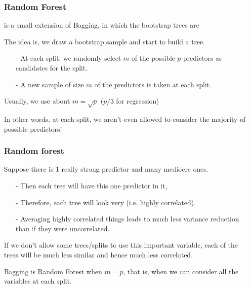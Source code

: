 \documentclass[12pt]{beamer}
\begin{document}
\begin{frame}[fragile]
\frametitle{Random Forest}
 is a small extension of Bagging, in which the bootstrap trees are   

\vsp
The idea is, we draw a bootstrap sample and start to build a tree. 
\begin{itemize}
\item[-] At each split, we randomly select
$m$ of the possible $p$ predictors as candidates for the split. 
\item[-] A new sample of size $m$ of the predictors is taken at each split. 
\end{itemize}   

\vsp
Usually, we use about $m = \sqrt{p}$  ($p/3$ for regression)\Note


\vsp
In other words, at each split, we aren't even allowed to consider the majority of possible predictors!
\end{frame}

\begin{frame}[fragile]
\frametitle{Random forest}

\vsp
Suppose there is 1 really strong predictor and many mediocre ones. 

\begin{itemize}
\item[-] Then each tree will have this one predictor in it,
\item[-] Therefore, each tree will look very  (i.e. highly correlated).  
\item[-] Averaging highly correlated things leads to much less variance reduction than if they were uncorrelated.
\end{itemize}
\vsp
If we don't allow some trees/splits to use this important variable, each of the trees will be much less similar and
hence much less correlated.

\vsp
Bagging is Random Forest when $m = p$, that is, when we can consider all the variables at each split.
\end{frame}
\end{document}
